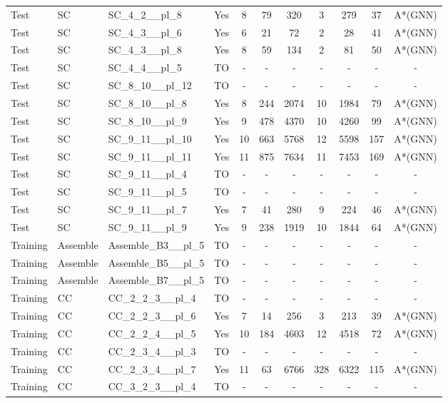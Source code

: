 \documentclass{article}
\begin{document}
\begin{tabular}{lllcccccccc}
Test & SC & SC\_4\_2\_\_pl\_8 & Yes & 8 & 79 & 320 & 3 & 279 & 37 & A*(GNN) \\
Test & SC & SC\_4\_3\_\_pl\_6 & Yes & 6 & 21 & 72 & 2 & 28 & 41 & A*(GNN) \\
Test & SC & SC\_4\_3\_\_pl\_8 & Yes & 8 & 59 & 134 & 2 & 81 & 50 & A*(GNN) \\
Test & SC & SC\_4\_4\_\_pl\_5 & TO & - & - & - & - & - & - & - \\
Test & SC & SC\_8\_10\_\_pl\_12 & TO & - & - & - & - & - & - & - \\
Test & SC & SC\_8\_10\_\_pl\_8 & Yes & 8 & 244 & 2074 & 10 & 1984 & 79 & A*(GNN) \\
Test & SC & SC\_8\_10\_\_pl\_9 & Yes & 9 & 478 & 4370 & 10 & 4260 & 99 & A*(GNN) \\
Test & SC & SC\_9\_11\_\_pl\_10 & Yes & 10 & 663 & 5768 & 12 & 5598 & 157 & A*(GNN) \\
Test & SC & SC\_9\_11\_\_pl\_11 & Yes & 11 & 875 & 7634 & 11 & 7453 & 169 & A*(GNN) \\
Test & SC & SC\_9\_11\_\_pl\_4 & TO & - & - & - & - & - & - & - \\
Test & SC & SC\_9\_11\_\_pl\_5 & TO & - & - & - & - & - & - & - \\
Test & SC & SC\_9\_11\_\_pl\_7 & Yes & 7 & 41 & 280 & 9 & 224 & 46 & A*(GNN) \\
Test & SC & SC\_9\_11\_\_pl\_9 & Yes & 9 & 238 & 1919 & 10 & 1844 & 64 & A*(GNN) \\
Training & Assemble & Assemble\_B3\_\_pl\_5 & TO & - & - & - & - & - & - & - \\
Training & Assemble & Assemble\_B5\_\_pl\_5 & TO & - & - & - & - & - & - & - \\
Training & Assemble & Assemble\_B7\_\_pl\_5 & TO & - & - & - & - & - & - & - \\
Training & CC & CC\_2\_2\_3\_\_pl\_4 & TO & - & - & - & - & - & - & - \\
Training & CC & CC\_2\_2\_3\_\_pl\_6 & Yes & 7 & 14 & 256 & 3 & 213 & 39 & A*(GNN) \\
Training & CC & CC\_2\_2\_4\_\_pl\_5 & Yes & 10 & 184 & 4603 & 12 & 4518 & 72 & A*(GNN) \\
Training & CC & CC\_2\_3\_4\_\_pl\_3 & TO & - & - & - & - & - & - & - \\
Training & CC & CC\_2\_3\_4\_\_pl\_7 & Yes & 11 & 63 & 6766 & 328 & 6322 & 115 & A*(GNN) \\
Training & CC & CC\_3\_2\_3\_\_pl\_4 & TO & - & - & - & - & - & - & - \\

\end{tabular}
\end{document}
